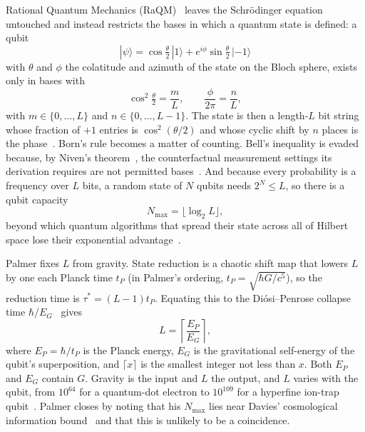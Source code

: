 \documentclass[aps,prd,twocolumn,superscriptaddress,nofootinbib,showkeys]{revtex4-2}
\begin{document}
Rational Quantum Mechanics (RaQM)~\cite{palmer2020,palmer2026,palmer2026b,palmer2026c} leaves the Schr\"odinger equation untouched and instead restricts the bases in which a quantum state is defined: a qubit
\begin{equation}
|\psi\rangle = \cos\tfrac{\theta}{2}\,|1\rangle + e^{i\phi}\sin\tfrac{\theta}{2}\,|{-1}\rangle
\label{eq:qubit}
\end{equation}
with $\theta$ and $\phi$ the colatitude and azimuth of the state on the Bloch sphere, exists only in bases with
\begin{equation}
\cos^2\tfrac{\theta}{2} = \frac{m}{L},\qquad \frac{\phi}{2\pi} = \frac{n}{L},
\label{eq:raqm}
\end{equation}
with $m\in\{0,\dots,L\}$ and $n\in\{0,\dots,L-1\}$. The state is then a length-$L$ bit string whose fraction of $+1$ entries is $\cos^2(\theta/2)$ and whose cyclic shift by $n$ places is the phase~\cite{palmer2026}. Born's rule becomes a matter of counting. Bell's inequality is evaded because, by Niven's theorem~\cite{niven1956,jahnel2010}, the counterfactual measurement settings its derivation requires are not permitted bases~\cite{palmer2024,palmer2026b}. And because every probability is a frequency over $L$ bits, a random state of $N$ qubits needs $2^N \le L$, so there is a qubit capacity
\begin{equation}
N_{\max} = \lfloor\log_2 L\rfloor ,
\label{eq:nmax}
\end{equation}
beyond which quantum algorithms that spread their state across all of Hilbert space lose their exponential advantage~\cite{palmer2026}.

Palmer fixes $L$ from gravity. State reduction is a chaotic shift map that lowers $L$ by one each Planck time $t_P$ (in Palmer's ordering, $t_P = \sqrt{\hbar G/c^5}$), so the reduction time is $\tau^* = (L-1)t_P$. Equating this to the Di\'osi--Penrose collapse time $\hbar/E_G$~\cite{diosi1989,penrose1996} gives
\begin{equation}
L = \left\lceil\frac{E_P}{E_G}\right\rceil ,
\label{eq:palmerL}
\end{equation}
where $E_P = \hbar/t_P$ is the Planck energy, $E_G$ is the gravitational self-energy of the qubit's superposition, and $\lceil x\rceil$ is the smallest integer not less than $x$. Both $E_P$ and $E_G$ contain $G$. Gravity is the input and $L$ the output, and $L$ varies with the qubit, from $10^{64}$ for a quantum-dot electron to $10^{109}$ for a hyperfine ion-trap qubit~\cite{palmer2026}. Palmer closes by noting that his $N_{\max}$ lies near Davies' cosmological information bound~\cite{davies2007,lloyd2002} and that this is unlikely to be a coincidence.
\end{document}
